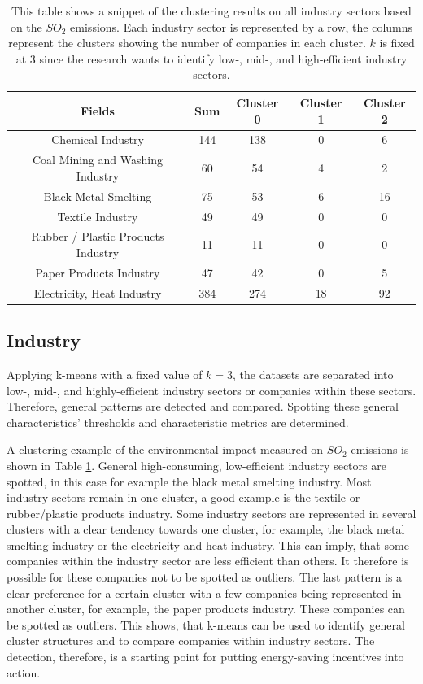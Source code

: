 \begin{table}[H]
    \centering
    \begin{tabular}{|c|c|c|c|c|}
        \hline
        \textbf{Fields} & \textbf{Sum} & \textbf{Cluster 0} & \textbf{Cluster 1} & \textbf{Cluster 2} \\
        \hline
        Chemical Industry & 144 & 138 & 0 & 6 \\
        Coal Mining and Washing Industry & 60 & 54 & 4 & 2 \\
        Black Metal Smelting & 75 & 53 & 6 & 16 \\
        Textile Industry & 49 & 49 & 0 & 0 \\
        Rubber / Plastic Products Industry & 11 & 11 & 0 & 0 \\
        Paper Products Industry & 47 & 42 & 0 & 5 \\
        Electricity, Heat Industry & 384 & 274 & 18 & 92 \\
        \hline
    \end{tabular}
    \caption{This table shows a snippet of the clustering results on all industry sectors based on the $SO_2$ emissions.
    Each industry sector is represented by a row, the columns represent the clusters showing the number of companies in each cluster.
    $k$ is fixed at $3$ since the research wants to identify low-, mid-, and high-efficient industry sectors.
    }
    \label{tab:multi_industries_clustering_results_based_on_the_so2_emission}
\end{table}

\subsection{Industry}
Applying k-means with a fixed value of $k=3$, the datasets are separated into low-, mid-, and highly-efficient industry sectors or companies within these sectors.
Therefore, general patterns are detected and compared.
Spotting these general characteristics' thresholds and characteristic metrics are determined.

A clustering example of the environmental impact measured on $SO_2$ emissions is shown in Table \ref{tab:multi_industries_clustering_results_based_on_the_so2_emission}.
General high-consuming, low-efficient industry sectors are spotted, in this case for example the black metal smelting industry.
Most industry sectors remain in one cluster, a good example is the textile or rubber/plastic products industry.
Some industry sectors are represented in several clusters with a clear tendency towards one cluster, for example, the black metal smelting industry or the electricity and heat industry.
This can imply, that some companies within the industry sector are less efficient than others.
It therefore is possible for these companies not to be spotted as outliers.
The last pattern is a clear preference for a certain cluster with a few companies being represented in another cluster, for example, the paper products industry.
These companies can be spotted as outliers.
This shows, that k-means can be used to identify general cluster structures and to compare companies within industry sectors.
The detection, therefore, is a starting point for putting energy-saving incentives into action.

